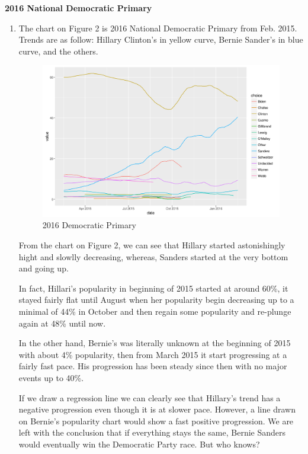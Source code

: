 \documentclass{article}[14pt]
\begin{document}
\bigskip
\begin{section}
{ \bf \large 2016 National Democratic  Primary} 
\bigskip
\begin{enumerate}[]
\item %
The chart on Figure 2 is 2016 National Democratic Primary from Feb. 2015. Trends are as follow: Hillary Clinton's  in yellow curve, Bernie Sander's  in blue curve, and the others.
\begin{figure}[h]
\begin{center}
\includegraphics[width=\linewidth]{dem}
\end{center}
\caption{2016 Democratic Primary}
\label{fig:figure 2}
\end{figure}

\medspace
From the chart on Figure 2, we can see that Hillary started astonishingly hight and slowlly decreasing, whereas, Sanders started at the very bottom and going up.

In fact, Hillari's popularity in beginning of 2015 started at around 60\%, it stayed fairly flat until August when her popularity begin decreasing up to a minimal of 44\% in October and then regain some popularity and re-plunge again at 48\% until now. 

In the other hand, Bernie's was literally unknown at the beginning of 2015 with about 4\% popularity, then from March 2015  it start progressing at a fairly fast pace. His progression has been steady since then with no major events up to 40\%.

If we draw a regression line we can clearly see that Hillary's trend has a negative progression even though it is at slower pace. However, a line drawn on Bernie's popularity chart would show a fast positive progression. We are left with the conclusion that if everything stays the same, Bernie Sanders would eventually win the Democratic Party race. But who knows? 


\end{enumerate}
\end{section}
\end{document}
